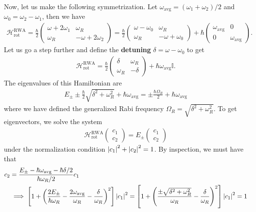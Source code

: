 \documentclass{article}
\theoremstyle{definition}
\newcommand{\ham}{\mathcal{H}}
\newcommand{\f}[2]{\frac{#1}{#2}}
\newcommand{\lp}{\left(}
\newcommand{\rp}{\right)}
\newcommand{\lb}{\left[}
\newcommand{\rb}{\right]}
\newcommand{\RWA}{\ham_\text{rot}^\text{RWA}}
\begin{document}
\begin{enumerate}[label=\alph*)]
	
	Now, let us make the following symmetrization. Let $\omega_\text{avg} = (\omega_1 + \omega_2)/2$ and $\omega_0 = \omega_2 - \omega_1$, then we have
	\begin{align*}
	\RWA = \f{\hbar}{2} \begin{pmatrix}
	\omega +  2\omega_1 & \omega_R \\ 
	\omega_R  & -\omega + 2\omega_2
	\end{pmatrix}
	= 
	\f{\hbar}{2} \begin{pmatrix}
	\omega -  \omega_0 & \omega_R \\ 
	\omega_R  & -\omega +\omega_0 
	\end{pmatrix}
	+ \hbar \begin{pmatrix}
	\omega_\text{avg} & 0 \\ 0 & \omega_\text{avg}
	\end{pmatrix}.
	\end{align*}
	Let us go a step further and define the \textbf{detuning} $\delta = \omega - \omega_0$ to get
	\begin{align*}
	\RWA = \f{\hbar}{2}\begin{pmatrix}
	\delta & \omega_R \\  \omega_R & -\delta
	\end{pmatrix} + \hbar \omega_\text{avg} \mathbb{I}.
	\end{align*}
	The eigenvalues of this Hamiltonian are
	\begin{align*}
	E_\pm \pm \f{\hbar}{2}\sqrt{\delta^2 + \omega_R^2} + \hbar \omega_\text{avg} = \pm \f{\hbar \Omega_R}{2} + \hbar \omega_\text{avg}
	\end{align*}
	where we have defined the generalized Rabi frequency $\Omega_R = \sqrt{\delta^2 + \omega_R^2}$. To get eigenvectors, we solve the system 
	\begin{align*}
	\RWA \begin{pmatrix}
	c_1 \\ c_2
	\end{pmatrix} = E_\pm \begin{pmatrix}
	c_1 \\ c_2
	\end{pmatrix}
	\end{align*}	
	under the normalization condition $\abs{c_1}^2 + \abs{c_2}^2 = 1$. By inspection, we must have that
	\begin{align*}
	c_2 &=  \f{E_\pm - \hbar \omega_\text{avg} - \hbar \delta/2}{\hbar \omega_R/2} c_1 \\
	&\implies \lb 1 + \lp \f{2E_\pm}{\hbar \omega_R}  - \f{2\omega_\text{avg}}{\omega_R} - \f{\delta}{\omega_R}\rp^2 \rb \abs{c_1}^2 = \lb 1 + \lp  \f{\pm \sqrt{\delta^2+\omega_R^2}}{\omega_R} - \f{\delta}{\omega_R}\rp^2 \rb \abs{c_1}^2 = 1

\end{align*}
\end{enumerate}
\end{document}
